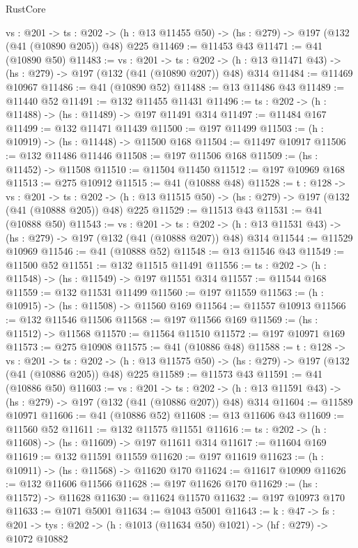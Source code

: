 \begin{lexlean}{RustCore}
\begin{coremodule}
  {vs : @201} ->
  {ts : @202} -> (h : @13 @11455 @50) -> (hs : @279) -> @197 (@132 (@41 (@10890 @205)) @48) @225
@11469 := @11453 @43
@11471 := @41 (@10890 @50)
@11483 := {vs : @201} ->
  {ts : @202} -> (h : @13 @11471 @43) -> (hs : @279) -> @197 (@132 (@41 (@10890 @207)) @48) @314
@11484 := @11469 @10967
@11486 := @41 (@10890 @52)
@11488 := @13 @11486 @43
@11489 := @11440 @52
@11491 := @132 @11455 @11431
@11496 := {ts : @202} -> (h : @11488) -> (hs : @11489) -> @197 @11491 @314
@11497 := @11484 @167
@11499 := @132 @11471 @11439
@11500 := @197 @11499
@11503 := (h : @10919) -> (hs : @11448) -> @11500 @168
@11504 := @11497 @10917
@11506 := @132 @11486 @11446
@11508 := @197 @11506 @168
@11509 := (hs : @11452) -> @11508
@11510 := @11504 @11450
@11512 := @197 @10969 @168
@11513 := @275 @10912
@11515 := @41 (@10888 @48)
@11528 := {t : @128} ->
  {vs : @201} ->
  {ts : @202} -> (h : @13 @11515 @50) -> (hs : @279) -> @197 (@132 (@41 (@10888 @205)) @48) @225
@11529 := @11513 @43
@11531 := @41 (@10888 @50)
@11543 := {vs : @201} ->
  {ts : @202} -> (h : @13 @11531 @43) -> (hs : @279) -> @197 (@132 (@41 (@10888 @207)) @48) @314
@11544 := @11529 @10969
@11546 := @41 (@10888 @52)
@11548 := @13 @11546 @43
@11549 := @11500 @52
@11551 := @132 @11515 @11491
@11556 := {ts : @202} -> (h : @11548) -> (hs : @11549) -> @197 @11551 @314
@11557 := @11544 @168
@11559 := @132 @11531 @11499
@11560 := @197 @11559
@11563 := (h : @10915) -> (hs : @11508) -> @11560 @169
@11564 := @11557 @10913
@11566 := @132 @11546 @11506
@11568 := @197 @11566 @169
@11569 := (hs : @11512) -> @11568
@11570 := @11564 @11510
@11572 := @197 @10971 @169
@11573 := @275 @10908
@11575 := @41 (@10886 @48)
@11588 := {t : @128} ->
  {vs : @201} ->
  {ts : @202} -> (h : @13 @11575 @50) -> (hs : @279) -> @197 (@132 (@41 (@10886 @205)) @48) @225
@11589 := @11573 @43
@11591 := @41 (@10886 @50)
@11603 := {vs : @201} ->
  {ts : @202} -> (h : @13 @11591 @43) -> (hs : @279) -> @197 (@132 (@41 (@10886 @207)) @48) @314
@11604 := @11589 @10971
@11606 := @41 (@10886 @52)
@11608 := @13 @11606 @43
@11609 := @11560 @52
@11611 := @132 @11575 @11551
@11616 := {ts : @202} -> (h : @11608) -> (hs : @11609) -> @197 @11611 @314
@11617 := @11604 @169
@11619 := @132 @11591 @11559
@11620 := @197 @11619
@11623 := (h : @10911) -> (hs : @11568) -> @11620 @170
@11624 := @11617 @10909
@11626 := @132 @11606 @11566
@11628 := @197 @11626 @170
@11629 := (hs : @11572) -> @11628
@11630 := @11624 @11570
@11632 := @197 @10973 @170
@11633 := @1071 @5001
@11634 := @1043 @5001
@11643 := {k : @47} ->
  {fs : @201} -> {tys : @202} -> (h : @1013 (@11634 @50) @1021) -> (hf : @279) -> @1072 @10882

\end{coremodule}
\end{lexlean}
